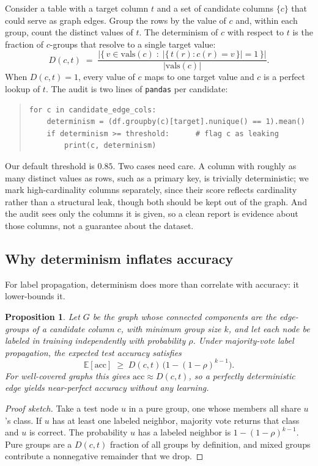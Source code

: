 \documentclass[11pt]{article}
\newcommand{\code}[1]{\texttt{#1}}
\newtheorem{proposition}{Proposition}
\begin{document}
Consider a table with a target column $t$ and a set of candidate columns
$\{c\}$ that could serve as graph edges. Group the rows by the value of $c$ and,
within each group, count the distinct values of $t$. The determinism of $c$
with respect to $t$ is the fraction of $c$-groups that resolve to a single
target value:
\[
  D(c, t) \;=\;
  \frac{\bigl|\{\, v \in \mathrm{vals}(c) \;:\; |\{\, t(r) : c(r) = v \,\}| = 1 \,\}\bigr|}
       {|\mathrm{vals}(c)|}.
\]
When $D(c,t)=1$, every value of $c$ maps to one target value and $c$ is a
perfect lookup of $t$. The audit is two lines of \code{pandas} per candidate:
\begin{quote}
\begin{verbatim}
for c in candidate_edge_cols:
    determinism = (df.groupby(c)[target].nunique() == 1).mean()
    if determinism >= threshold:      # flag c as leaking
        print(c, determinism)
\end{verbatim}
\end{quote}
Our default threshold is $0.85$. Two cases need care. A column with roughly as
many distinct values as rows, such as a primary key, is trivially deterministic;
we mark high-cardinality columns separately, since their score reflects
cardinality rather than a structural leak, though both should be kept out of the
graph. And the audit sees only the columns it is given, so a clean report is
evidence about those columns, not a guarantee about the dataset.

\subsection{Why determinism inflates accuracy}

For label propagation, determinism does more than correlate with accuracy: it
lower-bounds it.

\begin{proposition}
\label{prop:bound}
Let $G$ be the graph whose connected components are the edge-groups of a
candidate column $c$, with minimum group size $k$, and let each node be labeled
in training independently with probability $\rho$. Under majority-vote label
propagation, the expected test accuracy satisfies
\[
  \mathbb{E}[\mathrm{acc}] \;\ge\; D(c,t)\,\bigl(1-(1-\rho)^{k-1}\bigr).
\]
For well-covered graphs this gives $\mathrm{acc}\approx D(c,t)$, so a perfectly
deterministic edge yields near-perfect accuracy without any learning.
\end{proposition}

\begin{proof}[Proof sketch]
Take a test node $u$ in a pure group, one whose members all share $u$'s class.
If $u$ has at least one labeled neighbor, majority vote returns that class and
$u$ is correct. The probability $u$ has a labeled neighbor is
$1-(1-\rho)^{k-1}$. Pure groups are a $D(c,t)$ fraction of all groups by
definition, and mixed groups contribute a nonnegative remainder that we drop.
\end{proof}
\end{document}
